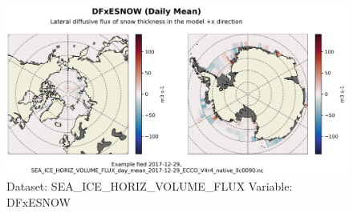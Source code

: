 \begin{figure}[H]
\centering
\includegraphics[scale=0.55]{../images/plots/native_plots/Sea-Ice_and_Snow_Horizontal_Volume_Fluxes/DFxESNOW.png}
\caption{Dataset: SEA\_ICE\_HORIZ\_VOLUME\_FLUX Variable: DFxESNOW}
\label{tab:table-SEA_ICE_HORIZ_VOLUME_FLUX_DFxESNOW-Plot}
\end{figure}
\pagebreak
